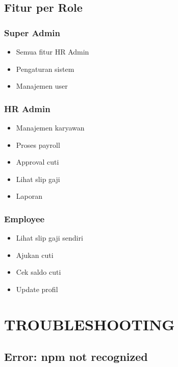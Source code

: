 \documentclass[12pt,a4paper]{article}
\begin{document}
\subsection{Fitur per Role}

\subsubsection{Super Admin}
\begin{itemize}
    \item Semua fitur HR Admin
    \item Pengaturan sistem
    \item Manajemen user
\end{itemize}

\subsubsection{HR Admin}
\begin{itemize}
    \item Manajemen karyawan
    \item Proses payroll
    \item Approval cuti
    \item Lihat slip gaji
    \item Laporan
\end{itemize}

\subsubsection{Employee}
\begin{itemize}
    \item Lihat slip gaji sendiri
    \item Ajukan cuti
    \item Cek saldo cuti
    \item Update profil
\end{itemize}

\newpage
\section{TROUBLESHOOTING}

\subsection{Error: npm not recognized}
\end{document}
